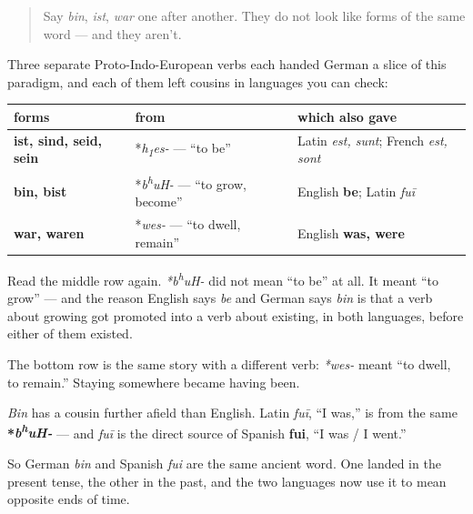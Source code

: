 \label{lesson:GE-C16-drei-wurzeln}



\begin{quote}
Say \emph{bin}, \emph{ist}, \emph{war} one after another. They do not look like forms of the same word — and they aren't.
\end{quote}

\begin{cousinweb}
Three separate Proto-Indo-European verbs each handed German a slice of this paradigm, and each of them left cousins in languages you can check:

\noindent
\begin{tabularx}{\linewidth}{@{}>{\raggedright\arraybackslash}X>{\raggedright\arraybackslash}X>{\raggedright\arraybackslash}X@{}}
\toprule
\textbf{forms} & \textbf{from} & \textbf{which also gave} \\
\midrule
\textbf{ist, sind, seid, sein} & *\emph{h\textsubscript{1}es-} — \textquotedblleft{}to be\textquotedblright{} & Latin \emph{est, sunt}; French \emph{est, sont} \\
\textbf{bin, bist} & *\emph{b\textsuperscript{h}uH-} — \textquotedblleft{}to grow, become\textquotedblright{} & English \textbf{be}; Latin \emph{fuī} \\
\textbf{war, waren} & *\emph{wes-} — \textquotedblleft{}to dwell, remain\textquotedblright{} & English \textbf{was, were} \\
\bottomrule
\end{tabularx}

Read the middle row again. \emph{*b\textsuperscript{h}uH-} did not mean \textquotedblleft{}to be\textquotedblright{} at all. It meant \textquotedblleft{}to grow\textquotedblright{} — and the reason English says \emph{be} and German says \emph{bin} is that a verb about growing got promoted into a verb about existing, in both languages, before either of them existed.

The bottom row is the same story with a different verb: \emph{*wes-} meant \textquotedblleft{}to dwell, to remain.\textquotedblright{} Staying somewhere became having been.
\end{cousinweb}

\begin{culture}
\emph{Bin} has a cousin further afield than English. Latin \emph{fuī}, \textquotedblleft{}I was,\textquotedblright{} is from the same \textbf{*\emph{b\textsuperscript{h}uH-}} — and \emph{fuī} is the direct source of Spanish \textbf{fui}, \textquotedblleft{}I was / I went.\textquotedblright{}

So German \emph{bin} and Spanish \emph{fui} are the same ancient word. One landed in the present tense, the other in the past, and the two languages now use it to mean opposite ends of time.
\end{culture}


